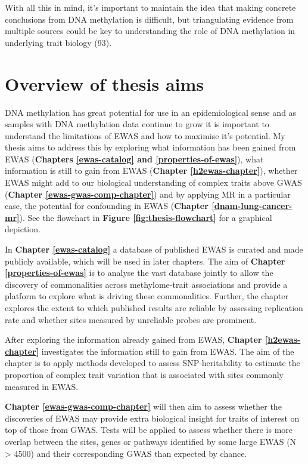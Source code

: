 \documentclass[11pt,twoside]{bristolthesis}
\begin{document}
With all this in mind, it's important to maintain the idea that making concrete conclusions from DNA methylation is difficult, but triangulating evidence from multiple sources could be key to understanding the role of DNA methylation in underlying trait biology (93).

\hypertarget{overview-of-thesis-aims}{%
\section{Overview of thesis aims}\label{overview-of-thesis-aims}}

DNA methylation has great potential for use in an epidemiological sense and as samples with DNA methylation data continue to grow it is important to understand the limitations of EWAS and how to maximise it's potential. My thesis aims to address this by exploring what information has been gained from EWAS (\textbf{Chapters \ref{ewas-catalog} and \ref{properties-of-ewas}}), what information is still to gain from EWAS (\textbf{Chapter \ref{h2ewas-chapter}}), whether EWAS might add to our biological understanding of complex traits above GWAS (\textbf{Chapter \ref{ewas-gwas-comp-chapter}}) and by applying MR in a particular case, the potential for confounding in EWAS (\textbf{Chapter \ref{dnam-lung-cancer-mr}}). See the flowchart in \textbf{Figure \ref{fig:thesis-flowchart}} for a graphical depiction.

In \textbf{Chapter \ref{ewas-catalog}} a database of published EWAS is curated and made publicly available, which will be used in later chapters. The aim of \textbf{Chapter \ref{properties-of-ewas}} is to analyse the vast database jointly to allow the discovery of commonalities across methylome-trait associations and provide a platform to explore what is driving these commonalities. Further, the chapter explores the extent to which published results are reliable by assessing replication rate and whether sites measured by unreliable probes are prominent.

After exploring the information already gained from EWAS, \textbf{Chapter \ref{h2ewas-chapter}} investigates the information still to gain from EWAS. The aim of the chapter is to apply methods developed to assess SNP-heritability to estimate the proportion of complex trait variation that is associated with sites commonly measured in EWAS.

\textbf{Chapter \ref{ewas-gwas-comp-chapter}} will then aim to assess whether the discoveries of EWAS may provide extra biological insight for traits of interest on top of those from GWAS. Tests will be applied to assess whether there is more overlap between the sites, genes or pathways identified by some large EWAS (N \textgreater{} 4500) and their corresponding GWAS than expected by chance.
\end{document}
